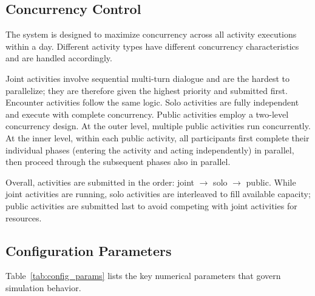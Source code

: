 \subsection{Concurrency Control}
\label{sec:appendix_concurrency}

The system is designed to maximize concurrency across all activity executions within a day.
Different activity types have different concurrency characteristics and are handled accordingly.

Joint activities involve sequential multi-turn dialogue and are the hardest to parallelize; they are therefore given the highest priority and submitted first.
Encounter activities follow the same logic.
Solo activities are fully independent and execute with complete concurrency.
Public activities employ a two-level concurrency design.
At the outer level, multiple public activities run concurrently.
At the inner level, within each public activity, all participants first complete their individual phases (entering the activity and acting independently) in parallel, then proceed through the subsequent phases also in parallel.

Overall, activities are submitted in the order: joint $\to$ solo $\to$ public.
While joint activities are running, solo activities are interleaved to fill available capacity; public activities are submitted last to avoid competing with joint activities for resources.





\subsection{Configuration Parameters}
\label{app:config}

Table~\ref{tab:config_params} lists the key numerical parameters that govern simulation behavior.

